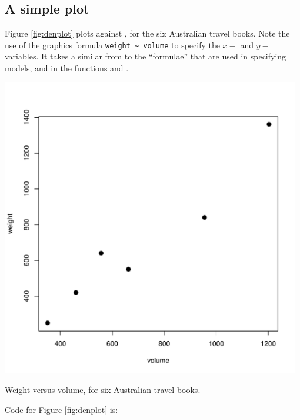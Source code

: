 \subsection*{A simple plot}
Figure \ref{fig:denplot} plots  against ,
for the six Australian travel books.  Note the use of the graphics
formula \verb!weight ~ volume! to specify the $x-$ and
$y-$variables. It takes a similar from to the ``formulae'' that are
used in specifying models, and in the functions  and
.
\begin{marginfigure}[-24pt]
\begin{knitrout}
\color{fgcolor}

{\centering \includegraphics[width=0.98\textwidth]{figs/01-denplot-1} 

}



\end{knitrout}
 \caption{Weight versus volume, for six Australian travel
books.}\label{fig:denplot}
\end{marginfigure}

Code for Figure \ref{fig:denplot} is:
\begin{knitrout}
\color{fgcolor}\begin{kframe}
\begin{alltt}
 \hlopt{~}  \hlstd{=}\hlstd{,} \hlstd{=}\hlstd{)}
 \hlstd{=}\hlstd{,} \hlstd{=}\hlstd{)}
\end{alltt}
\end{kframe}
\end{knitrout}

